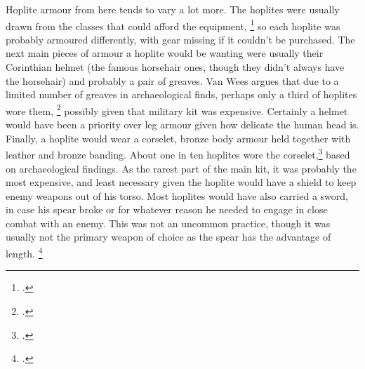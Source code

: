 \documentclass[twoside, a4paper, 12pt]{article}
\begin{document}
\par\vspace{1em}

Hoplite armour from here tends to vary a lot more. The hoplites
were usually drawn from the classes that could afford the
equipment, \footcite[38]{wietzel_wheeler_1970}
so each hoplite was probably armoured differently, with gear
missing if it couldn't be purchased. The next main pieces of armour a hoplite
would be wanting were usually their Corinthian helmet (the famous horsehair
ones, though they didn't always have the horsehair) and probably a pair of greaves.
Van Wees argues that due to a limited number of greaves in archaeological finds,
perhaps only a third of hoplites wore them, \footcite[50]{wees_2004} possibly given
that military kit was expensive. Certainly a helmet would have been a priority
over leg armour given how delicate the human head is. Finally, a hoplite would
wear a corselet, bronze body armour held together with leather and bronze banding.
About one in ten hoplites wore the corselet,\footcite{wees_1997} based on
archaeological findings. As the rarest part of the main kit,
it was probably the most expensive, and least necessary given the
hoplite would have a shield to keep enemy weapons out of his torso. Most hoplites
would have also carried a sword, in case his spear broke or for whatever reason
he needed to engage in close combat with an enemy. This was not an uncommon
practice, though it was usually not the primary weapon of choice as the spear
has the advantage of length. \footcite{snodgrass_2006}

\par\vspace{1em}
\end{document}
